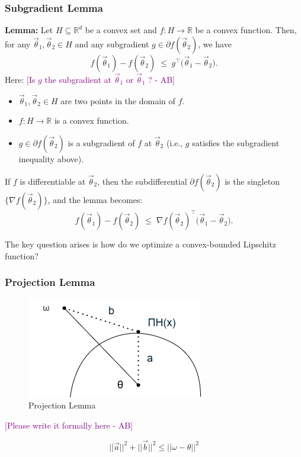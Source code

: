 \documentclass[11pt]{article}
\newcommand{\ab}[1]{\textcolor{purple}{[#1 - AB]}}
\theoremstyle{plain}
\begin{document}
\subsubsection{Subgradient Lemma}
\textbf{Lemma:}  
Let $H \subseteq \mathbb{R}^d$ be a convex set and $f : H \to \mathbb{R}$ be a convex function.  
Then, for any $\vec{\theta}_1, \vec{\theta}_2 \in H$ and any subgradient $g \in \partial f(\vec{\theta}_2)$, we have
\[
    f(\vec{\theta}_1) - f(\vec{\theta}_2) \;\le\; g^\top \big(\vec{\theta}_1 - \vec{\theta}_2\big).
\]
Here: \ab{Is $g$ the subgradient at $\vec{\theta}_1$ or $\vec{\theta}_1$ ?}
\begin{itemize}
    \item $\vec{\theta}_1, \vec{\theta}_2 \in H$ are two points in the domain of $f$.
    \item $f : H \to \mathbb{R}$ is a convex function.
    \item $g \in \partial f(\vec{\theta}_2)$ is a subgradient of $f$ at $\vec{\theta}_2$ (i.e., $g$ satisfies the subgradient inequality above).
\end{itemize}

If $f$ is differentiable at $\vec{\theta}_2$, then the subdifferential $\partial f(\vec{\theta}_2)$ is the singleton $\{\nabla f(\vec{\theta}_2)\}$, and the lemma becomes:
\[
    f(\vec{\theta}_1) - f(\vec{\theta}_2) \;\le\; \nabla f(\vec{\theta}_2)^\top \big(\vec{\theta}_1 - \vec{\theta}_2\big).
\]


The key question arises is how do we optimize a convex-bounded Lipschitz function?

\subsubsection{Projection Lemma}
\begin{figure}
    \centering
    \includegraphics[width=0.5\linewidth]{DS 603 diagram 001.png}
    \caption{Projection Lemma}
    \label{fig:placeholder}
\end{figure}

\ab{Please write it formally here}

\[
\lvert\lvert\vec{a}\rvert\rvert^2 + \lvert\lvert\vec{b}\rvert\rvert^2 \leq \lvert\lvert \omega -\theta\rvert\rvert^2
\]
\end{document}

